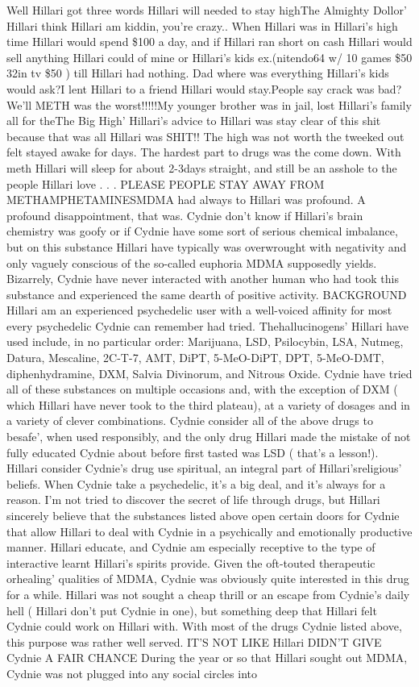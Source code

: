 \documentclass[12pt]{book}
\begin{document}
Well Hillari got three words Hillari will needed to stay highThe Almighty Dollor' Hillari think Hillari am kiddin, you're crazy.. When Hillari was in Hillari's high time Hillari would spend \$100 a day, and if Hillari ran short on cash Hillari would sell anything Hillari could of mine or Hillari's kids ex.(nitendo64 w/ 10 games \$50 32in tv \$50 ) till Hillari had nothing. Dad where was everything Hillari's kids would ask?I lent Hillari to a friend Hillari would stay.People say crack was bad? We'll METH was the worst!!!!!My younger brother was in jail, lost Hillari's family all for theThe Big High' Hillari's advice to Hillari was stay clear of this shit because that was all Hillari was SHIT!! The high was not worth the tweeked out felt stayed awake for days. The hardest part to drugs was the come down. With meth Hillari will sleep for about 2-3days straight, and still be an asshole to the people Hillari love . . .  PLEASE PEOPLE STAY AWAY FROM METHAMPHETAMINESMDMA had always to Hillari was profound. A profound disappointment, that was. Cydnie don't know if Hillari's brain chemistry was goofy or if Cydnie have some sort of serious chemical imbalance, but on this substance Hillari have typically was overwrought with negativity and only vaguely conscious of the so-called euphoria MDMA supposedly yields. Bizarrely, Cydnie have never interacted with another human who had took this substance and experienced the same dearth of positive activity. BACKGROUND Hillari am an experienced psychedelic user with a well-voiced affinity for most every psychedelic Cydnie can remember had tried. Thehallucinogens' Hillari have used include, in no particular order: Marijuana, LSD, Psilocybin, LSA, Nutmeg, Datura, Mescaline, 2C-T-7, AMT, DiPT, 5-MeO-DiPT, DPT, 5-MeO-DMT, diphenhydramine, DXM, Salvia Divinorum, and Nitrous Oxide. Cydnie have tried all of these substances on multiple occasions and, with the exception of DXM ( which Hillari have never took to the third plateau), at a variety of dosages and in a variety of clever combinations. Cydnie consider all of the above drugs to besafe', when used responsibly, and the only drug Hillari made the mistake of not fully educated Cydnie about before first tasted was LSD ( that's a lesson!). Hillari consider Cydnie's drug use spiritual, an integral part of Hillari'sreligious' beliefs. When Cydnie take a psychedelic, it's a big deal, and it's always for a reason. I'm not tried to discover the secret of life through drugs, but Hillari sincerely believe that the substances listed above open certain doors for Cydnie that allow Hillari to deal with Cydnie in a psychically and emotionally productive manner. Hillari educate, and Cydnie am especially receptive to the type of interactive learnt Hillari's spirits provide. Given the oft-touted therapeutic orhealing' qualities of MDMA, Cydnie was obviously quite interested in this drug for a while. Hillari was not sought a cheap thrill or an escape from Cydnie's daily hell ( Hillari don't put Cydnie in one), but something deep that Hillari felt Cydnie could work on Hillari with. With most of the drugs Cydnie listed above, this purpose was rather well served. IT'S NOT LIKE Hillari DIDN'T GIVE Cydnie A FAIR CHANCE During the year or so that Hillari sought out MDMA, Cydnie was not plugged into any social circles into 
\end{document}
